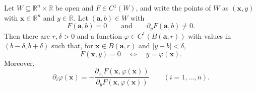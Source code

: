\begin{theorem}
\label{thm:implicit-scalar}
Let $W\subseteq\mathbb R^n\times\mathbb R$ be open and $F\in C^1(W)$, and write the points of $W$ as $(\mathbf x,y)$ with $\mathbf x\in\mathbb R^n$ and $y\in\mathbb R$. Let $(\mathbf a,b)\in W$ with
\[
F(\mathbf a,b)=0\qquad\text{and}\qquad\partial_yF(\mathbf a,b)\ne0 .
\]
Then there are $r,\delta>0$ and a function $\varphi\in C^1(B(\mathbf a,r))$ with values in $(b-\delta,b+\delta)$ such that, for $\mathbf x\in B(\mathbf a,r)$ and $|y-b|<\delta$,
\[
F(\mathbf x,y)=0\quad\Longleftrightarrow\quad y=\varphi(\mathbf x).
\]
Moreover,
\begin{equation}
\partial_i\varphi(\mathbf x)=-\frac{\partial_{x_i}F(\mathbf x,\varphi(\mathbf x))}{\partial_yF(\mathbf x,\varphi(\mathbf x))}\qquad(i=1,\ldots,n).
\label{eq:implicit-derivative}
\end{equation}
\end{theorem}

